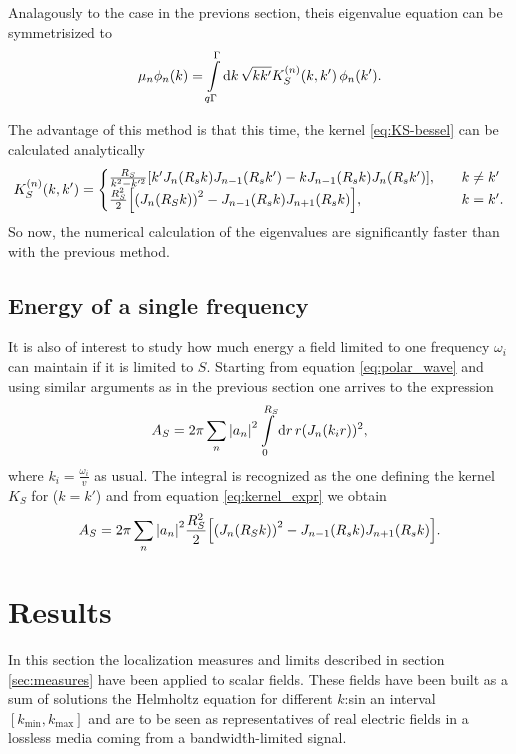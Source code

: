 \documentclass[11pt,a4paper, 
swedish,english %
]{article}
\begin{document}
Analagously to the case in the previons section, theis eigenvalue
equation can be symmetrisized to
\begin{equation}\label{eq:eig-n-bessel}
\mu_n\phi_n(k) = \int_{q\Gamma}^{\Gamma}\rd{k}\,
\sqrt{kk'} K_S^{(n)}(k, k')\,\phi_n(k').
\end{equation}

The advantage of this method is that this time, the kernel
\eqref{eq:KS-bessel} can be calculated analytically
\cite[Formula 5.54]{Gradshteyn-Ryzhik}
\begin{equation}\label{eq:kernel_expr}
K_S^{(n)}(k, k') =
\begin{cases}
\frac{R_S}{k^2-k'^2}
\qty[k'J_{n}(R_sk)J_{n-1}(R_sk')-kJ_{n-1}(R_sk)J_{n}(R_sk')]
\qc &k\neq k'\\
\frac{R_S^2}{2}\qty[ \qty(J_{n}(R_Sk))^2
-J_{n-1}(R_sk)J_{n+1}(R_sk)]
\qc &k= k'.
\end{cases}
\end{equation}
So now, the numerical calculation of the eigenvalues are significantly
faster than with the previous method.


\subsection{Energy of a single frequency}
It is also of interest to study how much energy a field limited to one frequency
$\omega_i$ can maintain if it is limited to $S$. Starting from equation \eqref{eq:polar_wave}
and using similar arguments as in the previous section one arrives to the expression
\begin{equation}
A_S=2\pi\sum_n \abs{a_n}^2\int_0^{R_S}\rd r \, r (J_n(k_ir))^2,
\end{equation}
where $k_i=\frac{\omega_i}{v}$ as usual.
The integral is recognized as the one defining the kernel $K_S$ for ($k=k'$) and from equation \eqref{eq:kernel_expr} we obtain
\begin{equation}\label{eq:energy_single}
A_S=2\pi \sum_n \abs{a_n}^2\frac{R_S^2}{2}\qty[ \qty(J_{n}(R_Sk))^2
-J_{n-1}(R_sk)J_{n+1}(R_sk)].
  \end{equation}


\section{Results}
In this section the localization measures and limits described in section \ref{sec:measures}
have been applied to scalar fields. These fields have been built as a sum of solutions the Helmholtz
equation for different $k$:sin an interval $[k_{\min},k_{\max}]$ and are to be seen as representatives
of real electric fields in a lossless media coming from a bandwidth-limited signal.
\end{document}
